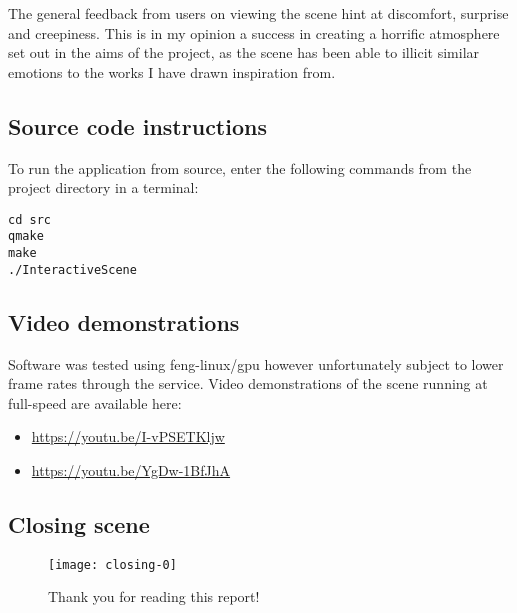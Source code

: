 \documentclass{article}
\begin{document}
	\bigskip
	
	The general feedback from users on viewing the scene hint at discomfort, surprise and creepiness. This is in my opinion
	a success in creating a horrific atmosphere set out in the aims of the project, as the scene has been 
	able to illicit similar emotions to the works I have drawn inspiration from.

	\subsection{Source code instructions}
	To run the application from source, enter the following commands from the project directory in a terminal:
	
	\bigskip
	
	\noindent
	\texttt{cd src\\qmake\\make\\./InteractiveScene}
	
	\subsection{Video demonstrations}
	Software was tested using feng-linux/gpu however unfortunately subject to lower frame rates through the service.
	Video demonstrations of the scene running at full-speed are available here:
	\begin{itemize}
		\item \url{https://youtu.be/I-vPSETKljw}
		\item \url{https://youtu.be/YgDw-1BfJhA}
	\end{itemize}
	
	\subsection{Closing scene}
	\begin{figure}[H]
		\centering	
		\texttt{[image: closing-0]}
		\caption{Thank you for reading this report!}
		\label{closing-scene}
	\end{figure}
\end{document}
